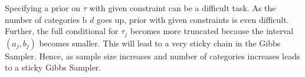 \documentclass{article}
\begin{document}
Specifying a prior on $\tau$ with given constraint can be a difficult task. As the number of categories b $d$ goes up, prior with given constraints is even difficult. Further, the full conditional for $\tau_j$ becomes more truncated because the interval $(a_j,b_j)$ becomes smaller. This will lead to a very sticky chain in the Gibbs Sampler. Hence, as sample size increases and number of categories increases leads to a sticky Gibbs Sampler. 
\end{document}
